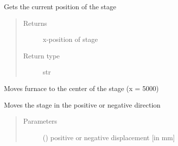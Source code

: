 \documentclass[letterpaper,10pt,english]{sphinxmanual}
\begin{document}
\begin{fulllineitems}
\begin{fulllineitems}
\begin{quote}
\begin{description}
\end{description}\end{quote}

\end{fulllineitems}


\begin{fulllineitems}
\label{\detokenize{source/laboratory.drivers:laboratory.drivers.motor.Motor.get_xpos}}
Gets the current position of the stage
\begin{quote}\begin{description}
\item[{Returns}] \leavevmode
x-position of stage

\item[{Return type}] \leavevmode
str

\end{description}\end{quote}

\end{fulllineitems}


\begin{fulllineitems}
\label{\detokenize{source/laboratory.drivers:laboratory.drivers.motor.Motor.home}}
Moves furnace to the center of the stage (x = 5000)

\end{fulllineitems}


\begin{fulllineitems}
\label{\detokenize{source/laboratory.drivers:laboratory.drivers.motor.Motor.move}}
Moves the stage in the positive or negative direction
\begin{quote}\begin{description}
\item[{Parameters}] \leavevmode
{} (\sphinxstyleliteralemphasis{\sphinxupquote{, }}) \textendash{} positive or negative displacement {[}in mm{]}


\end{description}
\end{quote}
\end{fulllineitems}
\end{fulllineitems}
\end{document}
